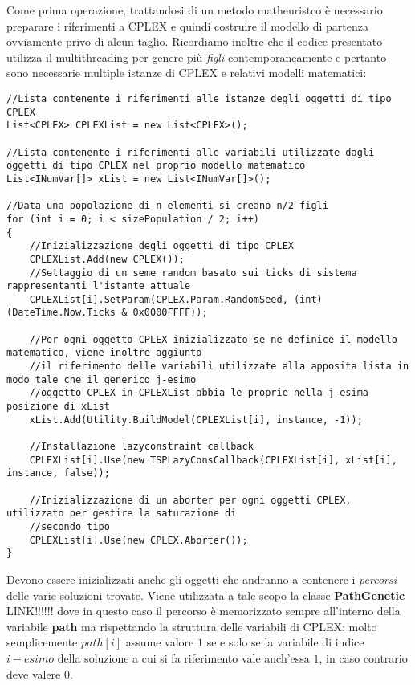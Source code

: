 \documentclass[11pt]{article}
\begin{document}
Come prima operazione, trattandosi di un metodo matheuristco è necessario preparare i riferimenti a CPLEX e quindi costruire il modello di partenza ovviamente privo di alcun taglio. Ricordiamo inoltre che il codice presentato utilizza il multithreading per genere più \textit{figli} contemporaneamente e pertanto sono necessarie multiple istanze di CPLEX e relativi modelli matematici:

\begin{lstlisting}
//Lista contenente i riferimenti alle istanze degli oggetti di tipo CPLEX
List<CPLEX> CPLEXList = new List<CPLEX>();

//Lista contenente i riferimenti alle variabili utilizzate dagli oggetti di tipo CPLEX nel proprio modello matematico
List<INumVar[]> xList = new List<INumVar[]>();

//Data una popolazione di n elementi si creano n/2 figli 
for (int i = 0; i < sizePopulation / 2; i++)
{
    //Inizializzazione degli oggetti di tipo CPLEX
    CPLEXList.Add(new CPLEX());
    //Settaggio di un seme random basato sui ticks di sistema rappresentanti l'istante attuale
    CPLEXList[i].SetParam(CPLEX.Param.RandomSeed, (int)(DateTime.Now.Ticks & 0x0000FFFF));

    //Per ogni oggetto CPLEX inizializzato se ne definice il modello matematico, viene inoltre aggiunto 
    //il riferimento delle variabili utilizzate alla apposita lista in modo tale che il generico j-esimo
    //oggetto CPLEX in CPLEXList abbia le proprie nella j-esima posizione di xList
    xList.Add(Utility.BuildModel(CPLEXList[i], instance, -1));

    //Installazione lazyconstraint callback
    CPLEXList[i].Use(new TSPLazyConsCallback(CPLEXList[i], xList[i], instance, false));

    //Inizializzazione di un aborter per ogni oggetti CPLEX, utilizzato per gestire la saturazione di 
    //secondo tipo
    CPLEXList[i].Use(new CPLEX.Aborter());
}
\end{lstlisting}

Devono essere inizializzati anche gli oggetti che andranno a contenere i \textit{percorsi} delle varie soluzioni trovate. Viene utilizzata a tale scopo la classe \textbf{PathGenetic} LINK!!!!!! dove in questo caso il percorso è memorizzato sempre all'interno della variabile \textbf{path} ma rispettando la struttura delle variabili di CPLEX: molto semplicemente $path[i]$ assume valore $1$ se e solo se la variabile di indice $i-esimo$ della soluzione a cui si fa riferimento vale anch'essa $1$, in caso contrario deve valere $0$.
\end{document}
